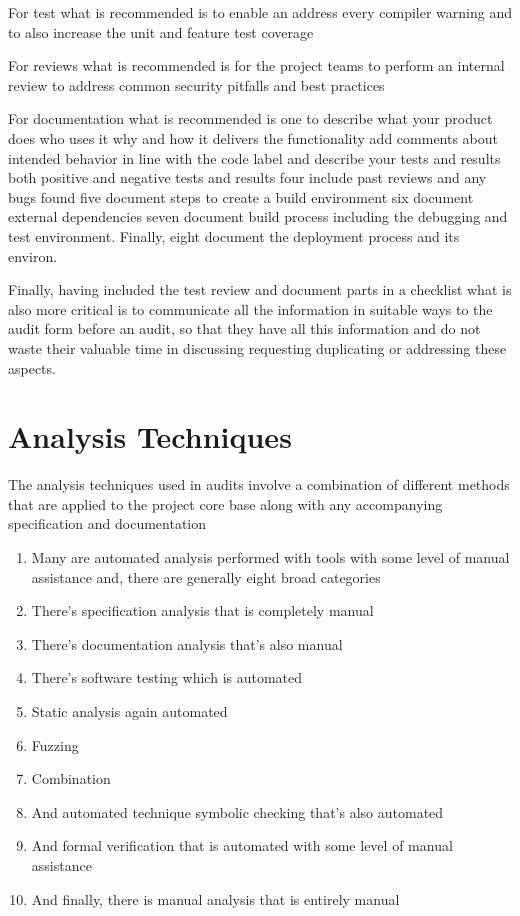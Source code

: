 For test what is recommended is to enable an address every compiler warning and to also increase the unit and feature test coverage 

For reviews what is recommended is for the project teams to perform an internal review to address common security pitfalls and best practices 

For documentation what is recommended is one to describe what your product does who uses it why and how it delivers the functionality add comments about intended behavior in line with the code label and describe your tests and results both positive and negative tests and results four include past reviews and any bugs found five document steps to create a build environment six document external dependencies seven document build process including the debugging and test environment. Finally, eight document the deployment process and its environ. 

Finally, having included the test review and document parts in a checklist what is also more critical is to communicate all the information in suitable ways to the audit form before an audit, so that they have all this information and do not waste their valuable time in discussing requesting duplicating or addressing these aspects.

\section{Analysis Techniques}

The analysis techniques used in audits involve a combination of different methods that are applied to the project core base along with any accompanying specification and documentation 

\begin{enumerate}
\item Many are automated analysis performed with tools with some level of manual assistance and, there are generally eight broad categories 
\item There's specification analysis that is completely manual 
\item There's documentation analysis that's also manual 
\item There's software testing which is automated 
\item Static analysis again automated 
\item Fuzzing 
\item Combination
\item And automated technique symbolic checking that's also automated 
\item And formal verification that is automated with some level of manual assistance 
\item And finally, there is manual analysis that is entirely manual 
\end{enumerate}

